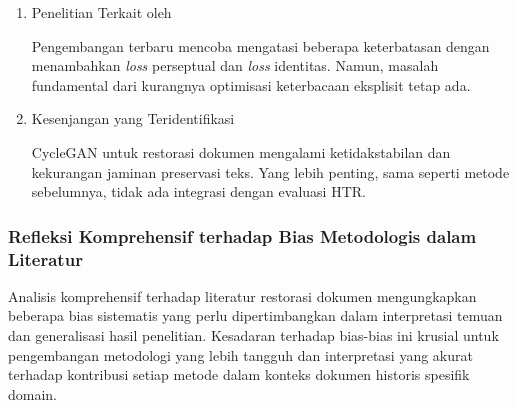 \documentclass[12pt,a4paper]{article}
\begin{document}
\begin{enumerate}[leftmargin=*, labelindent=0pt, itemsep=1ex, topsep=0pt]
\item Penelitian Terkait oleh \parencite{ni2024}

Pengembangan terbaru mencoba mengatasi beberapa keterbatasan dengan menambahkan \textit{loss} perseptual dan \textit{loss} identitas. Namun, masalah fundamental dari kurangnya optimisasi keterbacaan eksplisit tetap ada.

\item Kesenjangan yang Teridentifikasi

CycleGAN untuk restorasi dokumen mengalami ketidakstabilan dan kekurangan jaminan preservasi teks. Yang lebih penting, sama seperti metode sebelumnya, tidak ada integrasi dengan evaluasi HTR.

\end{enumerate}

\subsubsection{Refleksi Komprehensif terhadap Bias Metodologis dalam Literatur}
\label{subsubsec:refleksi-bias}

Analisis komprehensif terhadap literatur restorasi dokumen mengungkapkan beberapa bias sistematis yang perlu dipertimbangkan dalam interpretasi temuan dan generalisasi hasil penelitian. Kesadaran terhadap bias-bias ini krusial untuk pengembangan metodologi yang lebih tangguh dan interpretasi yang akurat terhadap kontribusi setiap metode dalam konteks dokumen historis spesifik domain.
\end{document}
